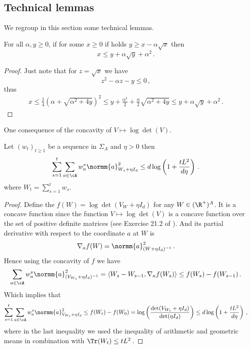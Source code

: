 \subsection{Technical lemmas}
We regroup in this section  some technical lemmas.
\begin{lemma}
\label{lem:inq_revert_sqrt}
For all $\alpha,y\geq 0$, if for some $x\geq 0$ if holds $y \geq x-\alpha\sqrt{x}$ then
\[
x \leq y + \alpha \sqrt{y} + \alpha^2\,.
\]
\end{lemma}
\begin{proof}
Just note that for $z=\sqrt{x}$ we have
\[
z^2-\alpha z -y \leq 0\,,
\]
thus
\begin{align*}
  x \leq \frac{1}{4}\left(\alpha +\sqrt{\alpha^2+4y}\right)^2
  \leq y +\frac{\alpha^2}{2}+\frac{\alpha}{2}\sqrt{\alpha^2+4y}
  \leq y +\alpha\sqrt{y}+\alpha^2\,.
\end{align*}
\end{proof}
One consequence of the concavity of $V\mapsto \log\det(V)$.
\begin{lemma}
\label{lem:sum_w_norm_a}
Let $(w_t)_{t\geq 1}$ be a sequence in $\Sigma_A$ and $\eta>0$ then
\[
\sum_{s=1}^t \sum_{a\in\cA} w_a^s \normm{a}^2_{W_s +\eta I_d} \leq d \log\left(1 +\frac{t L^2}{d \eta}\right)\,.
\]
where $W_t = \sum_{s=1}^t w_s$.
\end{lemma}
\begin{proof}
Define the $f(W)= \log\det(V_W+\eta I_d)$ for any $W\in(\R^+)^A$. It is a concave function since the function
$V\mapsto \log\det(V)$ is a concave function over the set of positive definite matrices (see Exercise 21.2 of \citealt{lattimore2018bandits}). And its partial derivative with respect to the coordinate $a$ at $W$ is
\[
    \nabla_a f(W) = \normm{a}^2_{(W+\eta I_d)^{-1}}\,.
\]
Hence using the concavity of $f$ we have
\begin{align*}
  \sum_{a\in\cA} w_a^s \normm{a}^2_{(V_{W_s} +\eta I_d)^{-1}} = \langle W_s - W_{s-1}, \nabla_a f(W_s) \rangle \leq f(W_s) - f(W_{s-1})\,.
\end{align*}
Which implies that
\begin{align*}
  \sum_{s=1}^t \sum_{a\in\cA} w_a^s \normm{a}^2_{V_{W_s} +\eta I_d} \leq f(W_t)-f(W_0) = \log\left(\frac{\det(V_{W_t} +\eta I_d) }{\det(\eta I_d)}\right) \leq d \log\left(1 +\frac{t L^2}{d \eta}\right)\,,
\end{align*}
where in the last inequality we used the inequality of arithmetic and geometric means in combination with $\Tr(W_t) \leq t L^2$\,.
\end{proof}
